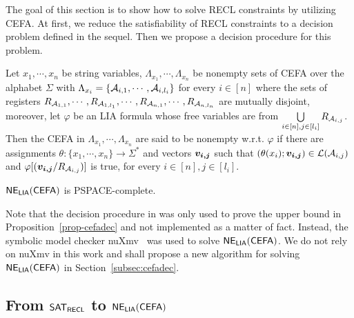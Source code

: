 
The goal of this section is to show how to solve RECL constraints by utilizing CEFA. 
At first, we reduce the satisfiability of RECL constraints to a decision problem defined in the sequel. Then we propose a decision procedure for this problem. 

\begin{definition}[$\cefadec$]
Let $x_1, \cdots, x_n$ be string variables, $\Lambda_{x_1}, \cdots, \Lambda_{x_n}$ be nonempty sets of CEFA over the alphabet $\Sigma$ with $\Lambda_{x_i} = \{\mathcal{A}_{i, 1}, \cdots, \mathcal{A}_{i, l_i}\}$ for every $i \in [n]$ where the sets of registers $R_{\mathcal{A}_{1, 1}}, \cdots, R_{\mathcal{A}_{1, l_1}}, \cdots, R_{\mathcal{A}_{n, 1}}, \cdots, R_{\mathcal{A}_{n, l_n}}$ are mutually disjoint, moreover, let $\varphi$ be an LIA formula whose free variables are from $ \bigcup \limits_{i \in [n], j \in [l_i]} R_{\mathcal{A}_{i, j}}$. Then  the CEFA in $\Lambda_{x_1}, \cdots, \Lambda_{x_n}$ are said to be nonempty w.r.t. $\varphi$ if there are assignments $\theta: \{x_1, \cdots, x_n\} \rightarrow \Sigma^*$ and vectors $\myvec{v_{i,j}}$
such that $(\theta(x_i); \myvec{v_{i,j}}) \in \Lang(\aut_{i, j})$ and  $\varphi[(\myvec{v_{i,j}}/R_{\aut_{i,j}})]$ is true, for every $i \in [n], j \in [l_i]$.
\end{definition}

\begin{proposition}\label{prop-cefadec}
$\cefadec$ is PSPACE-complete. 
\end{proposition}
Note that the decision procedure in \cite{atva2020} was only used to prove the upper bound in Proposition~\ref{prop-cefadec} and not implemented as a matter of fact. Instead, the symbolic model checker nuXmv~\cite{nuxmv} was used to solve $\cefadec$. We do not rely on nuXmv in this work and shall propose a new algorithm for solving $\cefadec$ in Section~\ref{subsec:cefadec}. 

\subsection{From ${\sf SAT_{RECL}}$ to $\cefadec$} \label{subsec:regex2cefa}

